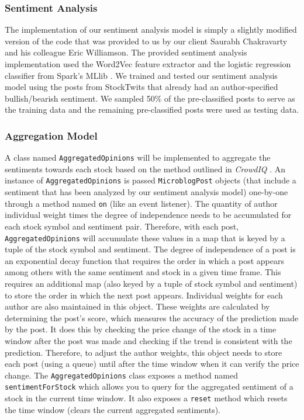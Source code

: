 \subsubsection{Sentiment Analysis}

The implementation of our sentiment analysis model is simply a slightly modified version of the code that was provided to us by our client Saurabh Chakravarty and his colleague Eric Williamson.
The provided sentiment analysis implementation used the Word2Vec feature extractor and the logistic regression classifier from Spark's MLlib \cite{sparkml}.
We trained and tested our sentiment analysis model using the posts from StockTwits that already had an author-specified bullish/bearish sentiment.
We sampled 50\% of the pre-classified posts to serve as the training data and the remaining pre-classified posts were used as testing data.

\subsubsection{Aggregation Model}

A class named \texttt{AggregatedOpinions} will be implemented to aggregate the sentiments towards each stock based on the method outlined in \textit{CrowdIQ} \cite{crowdiq}.
An instance of \texttt{AggregatedOpinions} is passed \texttt{MicroblogPost} objects (that include a sentiment that has been analyzed by our sentiment analysis model) one-by-one through a method named \texttt{on} (like an event listener).
The quantity of author individual weight times the degree of independence needs to be accumulated for each stock symbol and sentiment pair.
Therefore, with each post, \texttt{AggregatedOpinions} will accumulate these values in a map that is keyed by a tuple of the stock symbol and sentiment.
The degree of independence of a post is an exponential decay function that requires the order in which a post appears among others with the same sentiment and stock in a given time frame.
This requires an additional map (also keyed by a tuple of stock symbol and sentiment) to store the order in which the next post appears.
Individual weights for each author are also maintained in this object.
These weights are calculated by determining the post's score, which measures the accuracy of the prediction made by the post.
It does this by checking the price change of the stock in a time window after the post was made and checking if the trend is consistent with the prediction.
Therefore, to adjust the author weights, this object needs to store each post (using a queue) until after the time window when it can verify the price change.
The \texttt{AggregatedOpinions} class exposes a method named \texttt{sentimentForStock} which allows you to query for the aggregated sentiment of a stock in the current time window.
It also exposes a \texttt{reset} method which resets the time window (clears the current aggregated sentiments).

